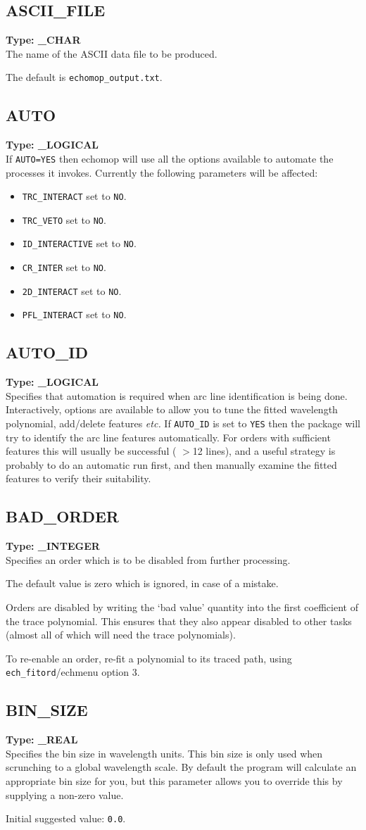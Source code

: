 \documentclass[11pt,twoside]{article}
\makeatletter
\newcommand{\htmlref}[2]{#1}
\newcommand{\xlabel}[1]{}
\newcommand{\indexcmdname}[1]{\index{#1@\protect\cmdname{#1}}}
\renewcommand{\indexcmdname}[1]{}
\newcommand{\cmdname}{\begingroup \catcode`\_=12 \realcmdname}
\newcommand{\realcmdname}[1]{\endgroup\texttt{#1}}
\newcommand{\echparameter}[4]
{
\item [#1 = #3] \mbox{}\label{par_#2}\indexcmdname{#2}
\\
#4
}
\renewcommand{\echparameter}[4]
{
  \subsection{\xlabel{par_#2}\label{par_#2}{\bf #1}}
  {\bf Type: #3}\\
#4
}
\makeatother
\begin{document}
\echparameter{ASCII\_FILE}{ASCII_FILE}{
 \_CHAR
}{
 The name of the ASCII data file to be produced.

 The default is {\tt echomop\_output.txt}.
}

\echparameter{AUTO}{AUTO}{
 \_LOGICAL
}{
 If \texttt{AUTO=YES} then {\sc echomop} will use all the options available
 to automate the processes it invokes.  Currently the following
 parameters will be affected:

\begin{itemize}
\item {\tt TRC\_INTERACT}     set to \texttt{NO}.
\item {\tt TRC\_VETO}         set to \texttt{NO}.
\item {\tt ID\_INTERACTIVE}   set to \texttt{NO}.
\item {\tt CR\_INTER}         set to \texttt{NO}.
\item {\tt 2D\_INTERACT}      set to \texttt{NO}.
\item {\tt PFL\_INTERACT}     set to \texttt{NO}.
\end{itemize}
}

\echparameter{AUTO\_ID}{AUTO_ID}{
 \_LOGICAL
}{
 Specifies that automation is required when arc line identification
 is being done.  Interactively, options are available to allow you
 to tune the fitted wavelength polynomial, add/delete features
 {\it etc.}  If {\tt AUTO\_ID} is set to \texttt{YES} then the package will
 try to identify
 the arc line features automatically.  For orders with sufficient
 features this will usually be successful ( $>$12 lines), and a useful
 strategy is probably to do an automatic run first, and then manually
 examine the fitted features to verify their suitability.
}

\echparameter{BAD\_ORDER}{BAD_ORDER}{
 \_INTEGER
}{
 Specifies an order which is to be disabled from further processing.

 The default value is zero which is ignored, in case of a mistake.

 Orders are disabled by writing the `bad value' quantity into the
 first coefficient of the trace polynomial.  This ensures that they
 also appear disabled to other tasks (almost all of which will need
 the trace polynomials).

 To re-enable an order, re-fit a polynomial to its traced path, using
 \htmlref{{\tt{ech\_fitord}}/echmenu option 3}{ech_fitord}.
}

\echparameter{BIN\_SIZE}{BIN_SIZE}{
 \_REAL
}{
 Specifies the bin size in wavelength units.  This bin size is only
 used when scrunching to a global wavelength scale.  By default the
 program will calculate an appropriate bin size for you, but this
 parameter allows you to override this by supplying a non-zero value.

 Initial suggested value: \texttt{0.0}.
}
\end{document}
